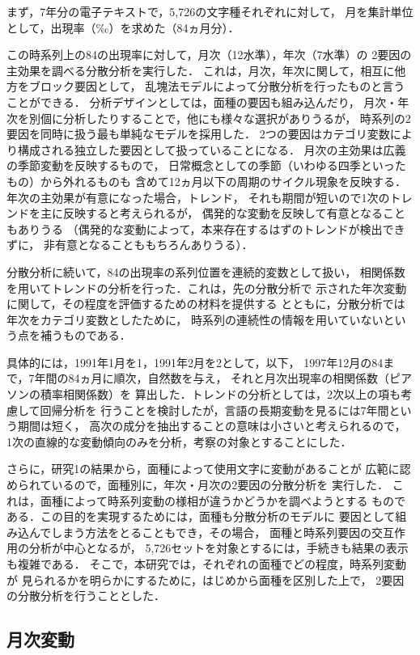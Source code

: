   まず，7年分の電子テキストで，5,726の文字種それぞれに対して，
月を集計単位として，出現率（‰）を求めた（84ヵ月分）．

  この時系列上の84の出現率に対して，月次（12水準），年次（7水準）の
2要因の主効果を調べる分散分析を実行した．
これは，月次，年次に関して，相互に他方をブロック要因として，
乱塊法モデルによって分散分析を行ったものと言うことができる．
分析デザインとしては，面種の要因も組み込んだり，
月次・年次を別個に分析したりすることで，他にも様々な選択がありうるが，
時系列の2要因を同時に扱う最も単純なモデルを採用した．
2つの要因はカテゴリ変数により構成される独立した要因として扱っていることになる．
月次の主効果は広義の季節変動を反映するもので，
日常概念としての季節（いわゆる四季といったもの）から外れるものも
含めて12ヵ月以下の周期のサイクル現象を反映する．
年次の主効果が有意になった場合，トレンド，
それも期間が短いので1次のトレンドを主に反映すると考えられるが，
偶発的な変動を反映して有意となることもありうる
（偶発的な変動によって，本来存在するはずのトレンドが検出できずに，
非有意となることももちろんありうる）． 

  分散分析に続いて，84の出現率の系列位置を連続的変数として扱い，
相関係数を用いてトレンドの分析を行った．これは，先の分散分析で
示された年次変動に関して，その程度を評価するための材料を提供する
とともに，分散分析では年次をカテゴリ変数としたために，
時系列の連続性の情報を用いていないという点を補うものである．

  具体的には，1991年1月を1，1991年2月を2として，以下，
1997年12月の84まで，7年間の84ヵ月に順次，自然数を与え，
それと月次出現率の相関係数（ピアソンの積率相関係数）を
算出した．トレンドの分析としては，2次以上の項も考慮して回帰分析を
行うことを検討したが，言語の長期変動を見るには7年間という期間は短く，
高次の成分を抽出することの意味は小さいと考えられるので，
1次の直線的な変動傾向のみを分析，考察の対象とすることにした．

  さらに，研究1の結果から，面種によって使用文字に変動があることが
広範に認められているので，面種別に，年次・月次の2要因の分散分析を
実行した．
これは，面種によって時系列変動の様相が違うかどうかを調べようとする
ものである．この目的を実現するためには，面種も分散分析のモデルに
要因として組み込んでしまう方法をとることもでき，その場合，
面種と時系列要因の交互作用の分析が中心となるが，
5,726セットを対象とするには，手続きも結果の表示も複雑である．
そこで，本研究では，それぞれの面種でどの程度，時系列変動が
見られるかを明らかにするために，はじめから面種を区別した上で，
2要因の分散分析を行うこととした．


\subsection{月次変動}

